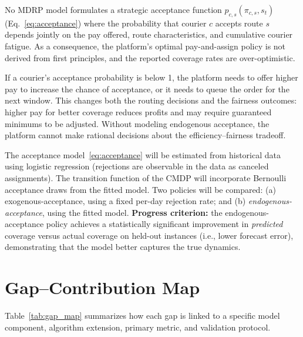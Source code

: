 \documentclass[12pt,a4paper]{report}
\begin{document}
No MDRP model formulates a strategic acceptance function $p_{c,s}(\pi_{c,s}, s_t)$
(Eq.~\ref{eq:acceptance}) where the probability that courier $c$ accepts route $s$ depends jointly on the pay offered, route characteristics, and cumulative courier fatigue. As a consequence, the platform's optimal pay-and-assign policy is not derived from first principles, and the reported coverage rates are over-optimistic.


If a courier's acceptance probability is below 1, the platform needs to offer higher pay to increase the chance of acceptance, or it needs to queue the order for the next window. This changes both the routing decisions and the fairness outcomes: higher pay for better coverage reduces profits and may require guaranteed minimums to be adjusted. Without modeling endogenous acceptance, the platform cannot make rational decisions about the efficiency--fairness tradeoff.


The acceptance model~\eqref{eq:acceptance} will be estimated from historical data using logistic regression (rejections are observable in the data as canceled assignments). The transition function of the CMDP will incorporate Bernoulli acceptance draws from the fitted model. Two policies will be compared: (a) exogenous-acceptance, using a fixed per-day rejection rate; and (b) \emph{endogenous-acceptance}, using the fitted model. \textbf{Progress criterion:} the endogenous-acceptance policy achieves a statistically significant improvement in \emph{predicted} coverage versus actual coverage on held-out instances (i.e., lower forecast error), demonstrating that the model better captures the true dynamics.


\section{Gap--Contribution Map}

Table~\ref{tab:gap_map} summarizes how each gap is linked to a specific model component, algorithm extension, primary metric, and validation protocol.
\end{document}
